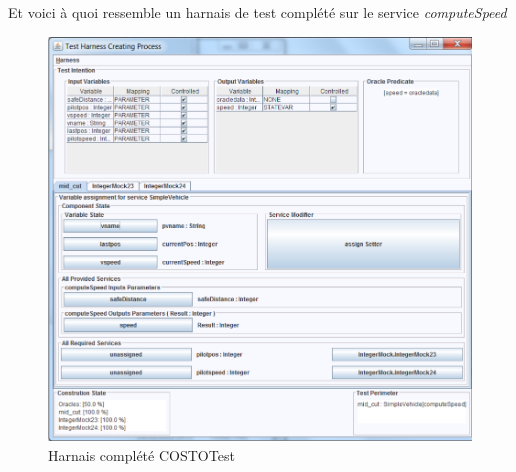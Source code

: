 Et voici à quoi ressemble un harnais de test complété sur le service \textit{computeSpeed}
\begin{figure}[H]
    \begin{center}
        \includegraphics[scale=0.55]{images/HarnaisFiniCOSTOTest.png}
        \caption{Harnais complété COSTOTest}
        \label{fig:SelectionServiceCOSTOTest}
    \end{center}
\end{figure}

    \vspace*{\fill}


